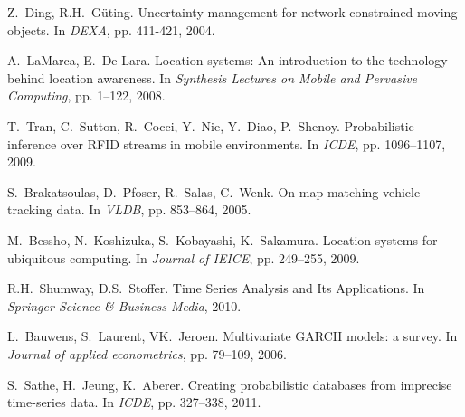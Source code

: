 \begin{frame}[allowframebreaks]
\begin{thebibliography}{99}
{
Z.~Ding, R.H.~G{\"u}ting.
\newblock Uncertainty management for network constrained moving objects.
\newblock In {\em DEXA}, pp. 411-421, 2004.

A.~LaMarca, E.~De Lara.
\newblock Location systems: An introduction to the technology behind location awareness.
\newblock In {\em Synthesis Lectures on Mobile and Pervasive Computing}, pp. 1--122, 2008.

T.~Tran, C.~Sutton, R.~Cocci, Y.~Nie, Y.~Diao, P.~Shenoy.
\newblock Probabilistic inference over RFID streams in mobile environments.
\newblock In {\em ICDE}, pp. 1096--1107, 2009.

S.~Brakatsoulas, D.~Pfoser, R.~Salas, C.~Wenk.
\newblock On map-matching vehicle tracking data.
\newblock In {\em VLDB}, pp. 853--864, 2005.

M.~Bessho, N.~Koshizuka, S.~Kobayashi, K.~Sakamura.
\newblock Location systems for ubiquitous computing.
\newblock In {\em Journal of IEICE}, pp. 249--255, 2009.

R.H.~Shumway, D.S.~Stoffer.
\newblock Time Series Analysis and Its Applications.
\newblock In {\em Springer Science \& Business Media}, 2010.

L.~Bauwens, S.~Laurent, VK.~Jeroen.
\newblock Multivariate GARCH models: a survey.
\newblock In {\em Journal of applied econometrics}, pp. 79--109, 2006.

S.~Sathe, H.~Jeung, K.~Aberer.
\newblock Creating probabilistic databases from imprecise time-series data.
\newblock In {\em ICDE}, pp. 327--338, 2011.

}
\end{thebibliography}

\end{frame}
